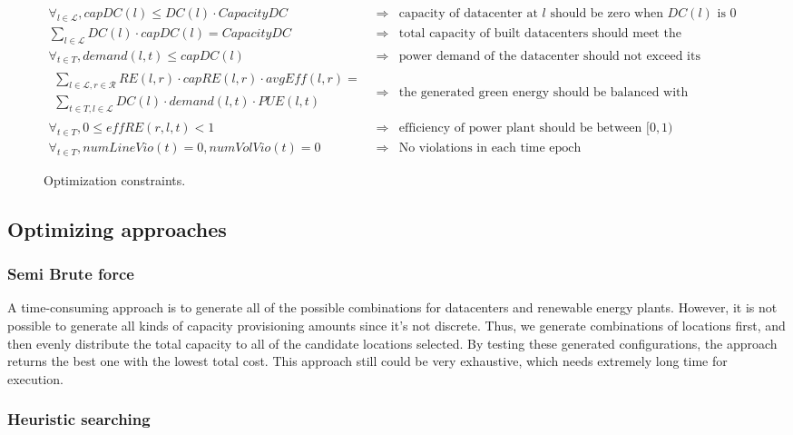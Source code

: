 \begin{figure*} [ht]
\begin{small}
\centering
\begin{eqnarray}
\forall_{l \in \mathcal{L}}, capDC(l) \leq DC(l) \cdot CapacityDC
&\Rightarrow& \text{capacity of datacenter at $l$ should be zero when $DC(l)$ is 0} \\
\sum_{l\in \mathcal{L}}{DC(l)\cdot capDC(l)} = CapacityDC
&\Rightarrow& \text{total capacity of built datacenters should meet the requirement} \\
\forall_{t \in T}, demand(l,t) \leq capDC(l)
&\Rightarrow& \text{power demand of the datacenter should not exceed its capacity} \\
\begin{split}
\sum_{l \in \mathcal{L},r \in \mathcal{R}}{ RE(l,r) \cdot capRE(l,r) \cdot avg\textit{Eff}(l,r) } = \\
\sum_{t \in T, l\in \mathcal{L}}{DC(l) \cdot demand(l,t)\cdot PUE(l,t)}
\end{split}
&\Rightarrow &\text{the generated green energy should be balanced with consumption} \\
\forall_{t \in T}, 0 \leq \textit{eff}RE(r,l,t) < 1
&\Rightarrow&  \text{efficiency of power plant should be between $[0,1)$} \\
\forall_{t \in T}, numLineVio(t)=0, numVolVio(t)=0
&\Rightarrow& \text{No violations in each time epoch}
\end{eqnarray}
\end{small}
\caption{Optimization constraints.}
\label{fig:constraints}
\end{figure*}

\subsection{Optimizing approaches}
\subsubsection{Semi Brute force}
A time-consuming approach is to generate all of the possible combinations for datacenters and renewable energy plants. However, it is not possible to generate all kinds of capacity provisioning amounts since it's not discrete. Thus, we generate combinations of locations first, and then evenly distribute the total capacity to all of the candidate locations selected. By testing these generated configurations, the approach returns the best one with the lowest total cost. This approach still could be very exhaustive, which needs extremely long time for execution.

\subsubsection{Heuristic searching}



